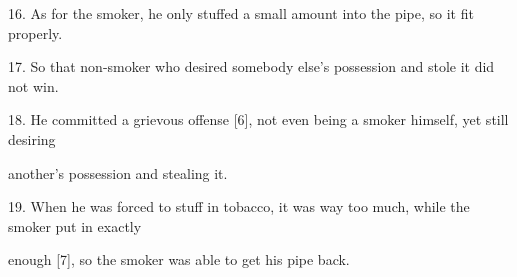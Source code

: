 {\LARGE{}16. As for the smoker, he only stuffed a small amount into the pipe, so
it fit properly.}

{\LARGE{}17. So that non-smoker who desired somebody else's possession and stole
it did not win.}

{\LARGE{}18. He committed a grievous offense [6], not even being a smoker himself,
yet still desiring       }

{\LARGE{}another's possession and stealing it.}

{\LARGE{}19. When he was forced to stuff in tobacco, it was way too much, while
the smoker put in exactly        }

{\LARGE{}enough [7], so the smoker was able to get his pipe back.}

